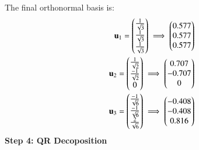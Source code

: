 \begin{enumerate}[label=\thesection.\arabic*,ref=\thesection.\theenumi]
The final orthonormal basis is:
\begin{align*}
\mathbf{u}_1 = \begin{pmatrix}\frac{1}{\sqrt{3}}\\ \frac{1}{\sqrt{3}}\\ \frac{1}{\sqrt{3}}\end{pmatrix} 
\implies\begin{pmatrix}0.577\\0.577\\0.577\end{pmatrix}\\
\mathbf{u}_2 = \begin{pmatrix}\frac{1}{\sqrt{2}}\\\frac{-1}{\sqrt{2}}\\0 \end{pmatrix}
\implies \begin{pmatrix}0.707 \\ -0.707 \\ 0\end{pmatrix}\\
\mathbf{u}_3 = \begin{pmatrix}\frac{-1}{\sqrt{6}}\\ \frac{-1}{\sqrt{6}}\\ \frac{2}{\sqrt{6}}\end{pmatrix} 
\implies \begin{pmatrix}-0.408\\-0.408\\0.816\end{pmatrix}
\end{align*}
\textbf{Step 4: QR Decoposition}


\end{enumerate}

